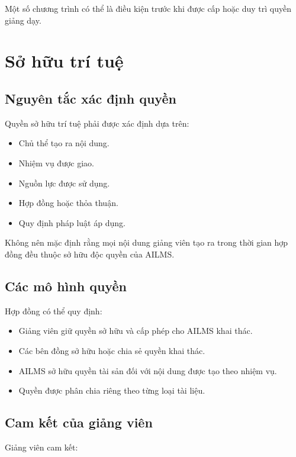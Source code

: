 \documentclass[12pt,a4paper]{article}
\begin{document}
Một số chương trình có thể là điều kiện trước khi được cấp
hoặc duy trì quyền giảng dạy.

\section{Sở hữu trí tuệ}

\subsection{Nguyên tắc xác định quyền}

Quyền sở hữu trí tuệ phải được xác định dựa trên:

\begin{itemize}
    \item Chủ thể tạo ra nội dung.
    \item Nhiệm vụ được giao.
    \item Nguồn lực được sử dụng.
    \item Hợp đồng hoặc thỏa thuận.
    \item Quy định pháp luật áp dụng.
\end{itemize}

Không nên mặc định rằng mọi nội dung giảng viên tạo ra
trong thời gian hợp đồng đều thuộc sở hữu độc quyền của AILMS.

\subsection{Các mô hình quyền}

Hợp đồng có thể quy định:

\begin{itemize}
    \item Giảng viên giữ quyền sở hữu và cấp phép cho AILMS khai thác.
    \item Các bên đồng sở hữu hoặc chia sẻ quyền khai thác.
    \item AILMS sở hữu quyền tài sản đối với nội dung được tạo theo nhiệm vụ.
    \item Quyền được phân chia riêng theo từng loại tài liệu.
\end{itemize}

\subsection{Cam kết của giảng viên}

Giảng viên cam kết:
\end{document}
